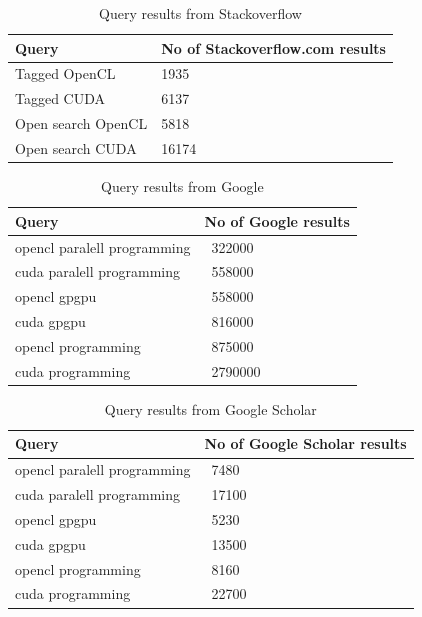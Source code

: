 \begin{table}[ht]
\centering
    \begin{tabular}{ | l | l |}
    \hline
    \textbf{Query} & \textbf{No of Stackoverflow.com results} \\ \hline
    Tagged OpenCL & 1935 \\ \hline
    Tagged CUDA & 6137 \\ \hline
    Open search OpenCL & 5818 \\ \hline
    Open search CUDA & 16174 \\ \hline
    \end{tabular}
    \caption{Query results from Stackoverflow}
    \label{fig:stackoverflow-terms-results}
\end{table}

\begin{table}[ht]
\centering
    \begin{tabular}{ | l | l |}
    \hline
    \textbf{Query} & \textbf{No of Google results} \\ \hline
    opencl paralell programming & ~322000 \\ \hline
    cuda paralell programming   & ~558000 \\ \hline
    opencl gpgpu                & ~558000 \\ \hline
    cuda gpgpu                  & ~816000 \\ \hline
    opencl programming          & ~875000 \\ \hline
    cuda programming            & ~2790000 \\ \hline
    \end{tabular}
    \caption{Query results from Google}
    \label{fig:google-terms-results}
\end{table}

\begin{table}[ht]
\centering
    \begin{tabular}{ | l | l |}
    \hline
    \textbf{Query} & \textbf{No of Google Scholar results} \\ \hline
    opencl paralell programming & ~7480 \\ \hline
    cuda paralell programming   & ~17100 \\ \hline
    opencl gpgpu                & ~5230 \\ \hline
    cuda gpgpu                  & ~13500 \\ \hline
    opencl programming          & ~8160 \\ \hline
    cuda programming            & ~22700 \\ \hline
    \end{tabular}
    \caption{Query results from Google Scholar}
    \label{fig:google-scholar-terms-results}
\end{table}


